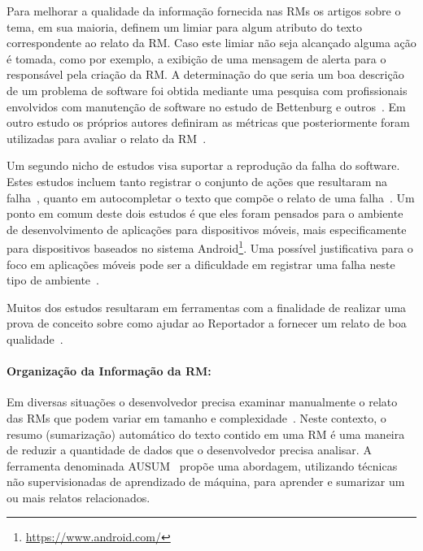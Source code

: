 Para melhorar a qualidade da informação fornecida nas RMs os artigos sobre o
tema, em sua maioria, definem um limiar para algum atributo do texto
correspondente ao relato da RM\@. Caso este limiar não seja alcançado alguma
ação é tomada, como por exemplo, a exibição de uma mensagem de alerta para o
responsável pela criação da RM\@. A determinação do que seria um boa descrição
de um problema de software foi obtida mediante uma pesquisa com profissionais
envolvidos com manutenção de software no estudo de Bettenburg e
outros~\cite{bettenburg2008makes}. Em outro estudo os próprios autores definiram
as métricas que posteriormente foram utilizadas para avaliar o relato da
RM~\cite{Tu:2014:MQI:2677832.2677844}.

Um segundo nicho de estudos visa suportar a reprodução da falha do software.
Estes estudos incluem tanto registrar o conjunto de ações que resultaram na
falha~\cite{White:2015:GRR:2820282.2820291}, quanto em autocompletar o texto que
compõe o relato de uma falha~\cite{moran2015auto}. Um ponto em comum deste dois
estudos é que eles foram pensados para o ambiente de desenvolvimento de
aplicações para dispositivos móveis, mais especificamente para dispositivos
baseados no sistema Android\footnote{\url{https://www.android.com/}}. Uma
possível justificativa para o foco em aplicações móveis pode ser a dificuldade
em registrar uma falha neste tipo de
ambiente~\cite{White:2015:GRR:2820282.2820291, moran2015auto}.

Muitos dos estudos resultaram em ferramentas com a finalidade de realizar uma
prova de conceito sobre como ajudar ao Reportador a fornecer um relato de boa
qualidade~\cite{Tu:2014:MQI:2677832.2677844, bettenburg2008makes,
    Wu2011a,White:2015:GRR:2820282.2820291,moran2015auto}.

\paragraph{Organização da Informação da RM:}

Em diversas situações o desenvolvedor precisa examinar manualmente o relato das
RMs que podem variar em tamanho e complexidade~\cite{mani2012ausum}. Neste
contexto, o resumo (sumarização) automático do texto contido em uma RM é uma
maneira de reduzir a quantidade de dados que o desenvolvedor precisa analisar.
A ferramenta denominada AUSUM~\cite{mani2012ausum} propõe uma abordagem,
utilizando técnicas não supervisionadas de aprendizado de máquina, para aprender
e sumarizar um ou mais relatos relacionados.


